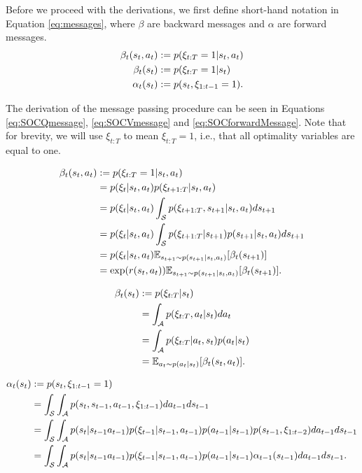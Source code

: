 \documentclass{report}
\numberwithin{equation}{section}
\numberwithin{figure}{section}
\numberwithin{table}{section}
\numberwithin{algorithm}{section}
\begin{document}
Before we proceed with the derivations,
we first define short-hand notation in Equation \ref{eq:messages}, 
where $\beta$ are backward messages and $\alpha$ are forward messages.
\begin{align}\label{eq:messages}
  \beta_t(s_t, a_t)&:=p(\xi_{t:T}=1|s_t, a_t)\notag\\
  \beta_t(s_t)&:=p(\xi_{t:T}=1|s_t)\notag\\
  \alpha_t(s_t)&:=p(s_t, \xi_{1:t-1}=1).
\end{align}

The derivation of the message passing procedure can be seen 
in Equations \ref{eq:SOCQmessage}, \ref{eq:SOCVmessage} and 
\ref{eq:SOCforwardMessage}. Note that for brevity, we will use 
$\xi_{t:T}$ to mean $\xi_{t:T}=1$, i.e., that all optimality variables 
are equal to one.

\begin{align}\label{eq:SOCQmessage}
  \beta_t(s_t, a_t)&:=p(\xi_{t:T}=1|s_t, a_t)\notag\\
  &=p(\xi_t|s_t, a_t)p(\xi_{t+1:T}|s_t, a_t)\notag\\
  &=p(\xi_t|s_t, a_t)\int_{\mathcal{S}}p(\xi_{t+1:T}, s_{t+1}|s_t,a_t)ds_{t+1}\notag\\
  &=p(\xi_t|s_t, a_t)\int_{\mathcal{S}}p(\xi_{t+1:T}|s_{t+1})p(s_{t+1}|s_t,a_t)ds_{t+1}\notag\\
  &=p(\xi_t|s_t, a_t)\mathbb{E}_{s_{t+1}\sim p(s_{t+1}|s_t, a_t)}[\beta_t(s_{t+1})]\notag\\
  &=\exp(r(s_t, a_t))\mathbb{E}_{s_{t+1}\sim p(s_{t+1}|s_t, a_t)}[\beta_t(s_{t+1})].
\end{align}

\begin{align}\label{eq:SOCVmessage}
  \beta_t(s_t)&:=p(\xi_{t:T}|s_t)\notag\\
  &=\int_{\mathcal{A}}p(\xi_{t:T},a_t|s_t)da_t\notag\\
  &=\int_{\mathcal{A}}p(\xi_{t:T}|a_t, s_t)p(a_t|s_t)\notag\\
  &=\mathbb{E}_{a_t\sim p(a_t|s_t)}[\beta_t(s_t, a_t)].
\end{align}

\begin{align}\label{eq:SOCforwardMessage}
  \alpha_t(s_t)&:=p(s_t, \xi_{1:t-1}=1)\notag\\
  &=\int_{\mathcal{S}}\int_{\mathcal{A}}p(s_t, s_{t-1},a_{t-1},\xi_{1:t-1})da_{t-1}ds_{t-1}\notag\\
  &=\int_{\mathcal{S}}\int_{\mathcal{A}}p(s_t|s_{t-1}a_{t-1})p(\xi_{t-1}|s_{t-1},a_{t-1})p(a_{t-1}|s_{t-1})p(s_{t-1}, \xi_{1:t-2})da_{t-1}ds_{t-1}\notag\\
  &=\int_{\mathcal{S}}\int_{\mathcal{A}}p(s_t|s_{t-1}a_{t-1})p(\xi_{t-1}|s_{t-1},a_{t-1})p(a_{t-1}|s_{t-1})\alpha_{t-1}(s_{t-1})da_{t-1}ds_{t-1}.
\end{align}
\end{document}
